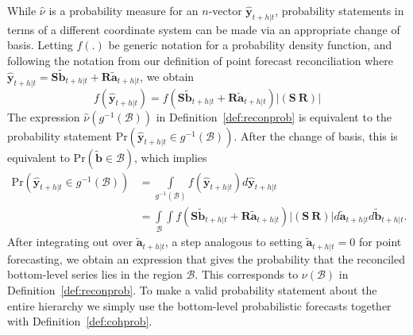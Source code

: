 \documentclass[a4paper, 11pt]{article}
\theoremstyle{definition}
\begin{document}
While $\hat{\nu}$ is a probability measure for an $n$-vector $\hat{\bm{y}}_{t+h|t}$, probability statements in terms of a different coordinate system can be made via an appropriate change of basis. Letting $f(.)$ be generic notation for a probability density function, and following the notation from our definition of point forecast reconciliation where $\hat{\bm{y}}_{t+h|t}=\bm{S}\tilde{\bm{b}}_{t+h|t}+\bm{R}\tilde{\bm{a}}_{t+h|t}$, we obtain
\begin{equation}
f(\hat{\bm{y}}_{t+h|t})=f(\bm{S}\tilde{\bm{b}}_{t+h|t}+\bm{R}\tilde{\bm{a}}_{t+h|t})|(\bm{S}~\bm{R})|
\end{equation}
The expression $\hat{\nu}(g^{-1}(\mathcal{B}))$ in Definition~\ref{def:reconprob} is equivalent to the probability statement $\text{Pr}(\hat{\bm{y}}_{t+h|t}\in g^{-1}(\mathcal{B}))$. After the change of basis, this is equivalent to $\text{Pr}(\tilde{\bm{b}}\in \mathcal{B})$, which implies
\begin{align}
\text{Pr}(\hat{\bm{y}}_{t+h|t}\in g^{-1}(\mathcal{B}))&=\int\limits_{g^{-1}(\mathcal{B})}f(\hat{\bm{y}}_{t+h|t})d\hat{\bm{y}}_{t+h|t}\\
&=\int\limits_{\mathcal{B}}\int f(\bm{S}\tilde{\bm{b}}_{t+h|t}+\bm{R}\tilde{\bm{a}}_{t+h|t})|(\bm{S}~\bm{R})|d\tilde{\bm{a}}_{t+h|t}d\tilde{\bm{b}}_{t+h|t}.
\end{align}
After integrating out over $\tilde{\bm{a}}_{t+h|t}$, a step analogous to setting $\tilde{\bm{a}}_{t+h|t}=0$ for point forecasting, we obtain an expression that gives the probability that the reconciled bottom-level series lies in the region $\mathcal{B}$. This corresponds to $\nu(\mathcal{B})$ in Definition~\ref{def:reconprob}. To make a valid probability statement about the entire hierarchy we simply use the bottom-level probabilistic forecasts together with Definition~\ref{def:cohprob}.

\end{document}
